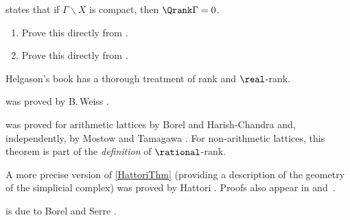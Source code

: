

\begin{exercises}

\item {} states that if $\Gamma
\backslash X$ is compact, then $\Qrank \Gamma = 0$.
	\begin{enumerate}
	\item Prove this directly from .
	\item Prove this directly from .
	\end{enumerate}

\end{exercises}




\begin{notes}

Helgason's book \cite{HelgasonBook} has a thorough treatment of
rank and $\real$-rank.

 was proved by B.\,Weiss \cite{Weiss-Qrank}.

 was proved  for arithmetic lattices by
Borel and Harish-Chandra \cite{BorelHarishChandra} and, independently, by
Mostow and Tamagawa \cite{MostowTamagawa}. For non-arithmetic lattices, this theorem is part of the \emph{definition} of $\rational$-rank.

A more precise version of \cref{HattoriThm} (providing a
description of the geometry of the simplicial complex) was proved by
Hattori \cite{Hattori}. 
Proofs also appear in \cite{JiMacpherson-GeomCpct} and~\cite{Leuzinger-TitsGeom}.

  is due to Borel and Serre
\cite{BorelSerre-corners}.

\end{notes}




